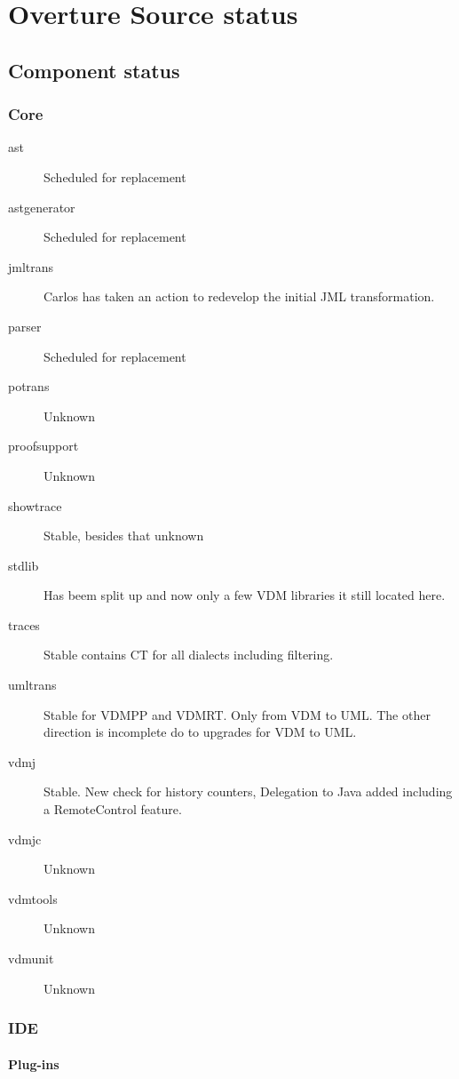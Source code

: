 \chapter{Overture Source status}
\section{Component status}

\subsection{Core}
\begin{description}

\item[ast] Scheduled for replacement
\item[astgenerator] Scheduled for replacement
\item[jmltrans] Carlos has taken an action to redevelop the initial JML transformation.
\item[parser] Scheduled for replacement
\item[potrans] Unknown
\item[proofsupport] Unknown
\item[showtrace] Stable, besides that unknown
\item[stdlib] Has beem split up and now only a few VDM libraries it still located here.
\item[traces] Stable contains CT for all dialects including filtering. 
\item[umltrans] Stable for VDMPP and VDMRT. Only from VDM to UML. The other direction is incomplete do to upgrades for VDM to UML.
\item[vdmj] Stable. New check for history counters, Delegation to Java added including a RemoteControl feature.
\item[vdmjc] Unknown
\item[vdmtools] Unknown
\item[vdmunit] Unknown

\end{description}

\subsection{IDE}

\subsubsection{Plug-ins}

